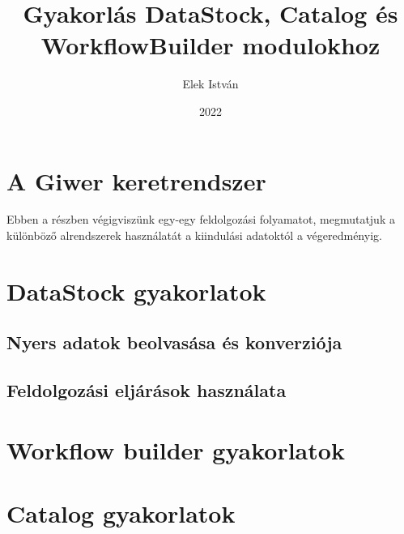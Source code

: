 \documentclass[a4paper,12pt]{article}
\begin{document}
	
	\author{Elek István}
	
	\title{Gyakorlás  \linebreak  \linebreak \linebreak \small DataStock, Catalog és WorkflowBuilder modulokhoz}
	
	
	\date{2022}
	
	
	\setcounter{tocdepth}{3}
	\maketitle
	\newpage
	\tableofcontents
	\newpage


\section{A Giwer keretrendszer}

Ebben a részben végigviszünk egy-egy feldolgozási folyamatot, megmutatjuk a különböző alrendszerek használatát a kiindulási adatoktól a végeredményig.

\section{DataStock gyakorlatok}

\subsection{Nyers adatok beolvasása és konverziója}

\subsection{Feldolgozási eljárások használata}

\section{Workflow builder gyakorlatok}

\section{Catalog gyakorlatok}
\end{document}

